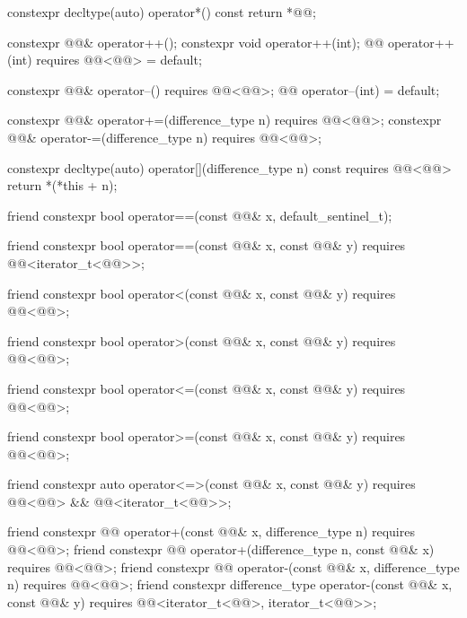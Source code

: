 \begin{codeblock}
{{    constexpr decltype(auto) operator*() const { return *@@; }

    constexpr @@& operator++();
    constexpr void operator++(int);
    @@ operator++(int) requires @@<@@> = default;

    constexpr @@& operator--() requires @@<@@>;
    @@ operator--(int) = default;

    constexpr @@& operator+=(difference_type n) requires @@<@@>;
    constexpr @@& operator-=(difference_type n) requires @@<@@>;

    constexpr decltype(auto) operator[](difference_type n) const
      requires @@<@@>
    { return *(*this + n); }

    friend constexpr bool operator==(const @@& x, default_sentinel_t);

    friend constexpr bool operator==(const @@& x, const @@& y)
      requires @@<iterator_t<@@>>;

    friend constexpr bool operator<(const @@& x, const @@& y)
      requires @@<@@>;

    friend constexpr bool operator>(const @@& x, const @@& y)
      requires @@<@@>;

    friend constexpr bool operator<=(const @@& x, const @@& y)
      requires @@<@@>;

    friend constexpr bool operator>=(const @@& x, const @@& y)
      requires @@<@@>;

    friend constexpr auto operator<=>(const @@& x, const @@& y)
      requires @@<@@> && @@<iterator_t<@@>>;

    friend constexpr @@ operator+(const @@& x, difference_type n)
      requires @@<@@>;
    friend constexpr @@ operator+(difference_type n, const @@& x)
      requires @@<@@>;
    friend constexpr @@ operator-(const @@& x, difference_type n)
      requires @@<@@>;
    friend constexpr difference_type operator-(const @@& x, const @@& y)
      requires @@<iterator_t<@@>, iterator_t<@@>>;

}}
\end{codeblock}
